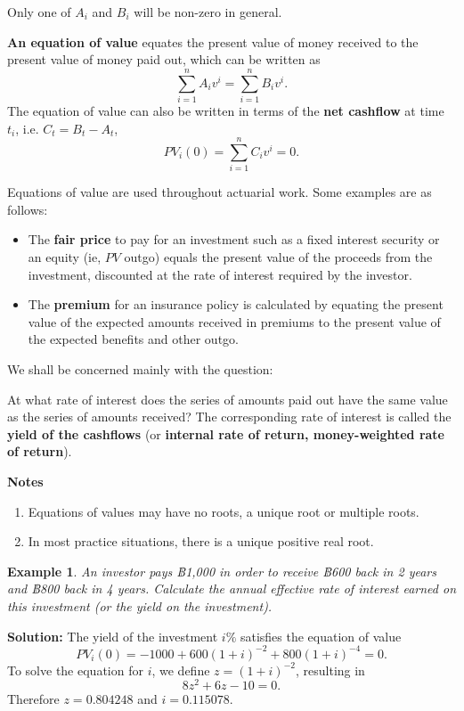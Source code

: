 \documentclass[
]{book}
\theoremstyle{definition}
\theoremstyle{definition}
\newtheorem{example}{Example}[chapter]
\theoremstyle{definition}
\theoremstyle{definition}
\theoremstyle{remark}
\begin{document}
Only one of \(A_i\) and \(B_i\) will be non-zero in general.

\textbf{An equation of value} equates the present value of money received to
the present value of money paid out, which can be written as
\[\sum_{i=1}^n A_i v^i = \sum_{i=1}^n B_i v^i.\] The equation of value
can also be written in terms of the \textbf{net cashflow} at time \(t_i\), i.e.
\(C_t = B_t - A_t\), \[PV_i(0) = \sum_{i=1}^n C_i v^i =0.\]

Equations of value are used throughout actuarial work. Some examples are
as follows:

\begin{itemize}
\item
  The \textbf{fair price} to pay for an investment such as a fixed interest
  security or an equity (ie, \(PV\) outgo) equals the present value of
  the proceeds from the investment, discounted at the rate of interest
  required by the investor.
\item
  The \textbf{premium} for an insurance policy is calculated by equating
  the present value of the expected amounts received in premiums to
  the present value of the expected benefits and other outgo.
\end{itemize}

We shall be concerned mainly with the question:

At what rate of interest does the series of amounts paid out have the
same value as the series of amounts received? The corresponding rate of
interest is called the \textbf{yield of the cashflows} (or \textbf{internal rate of
return, money-weighted rate of return}).

\textbf{Notes}

\begin{enumerate}
\def\labelenumi{\arabic{enumi}.}
\item
  Equations of values may have no roots, a unique root or multiple
  roots.
\item
  In most practice situations, there is a unique positive real root.
\end{enumerate}

\begin{example}
\emph{An investor pays ฿1,000 in order to receive ฿600 back in 2 years and
฿800 back in 4 years. Calculate the annual effective rate of interest
earned on this investment (or the yield on the investment).}
\end{example}

\textbf{Solution:} The yield of the investment \(i\%\) satisfies the equation
of value \[PV_i(0) =  -1000 + 600(1+i)^{-2} + 800(1+i)^{-4} = 0.\] To
solve the equation for \(i\), we define \(z = (1+i)^{-2}\), resulting in
\[8z^2 + 6z - 10 = 0.\] Therefore \(z = 0.804248\) and \(i = 0.115078.\)
\end{document}

